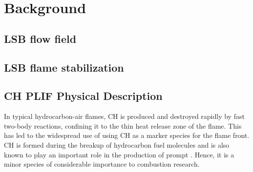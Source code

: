 \chapter{Background}






\section{LSB flow field}

\section{LSB flame stabilization}

\section{CH PLIF Physical Description}

In typical hydrocarbon-air flames, CH is produced and destroyed rapidly by fast two-body reactions, confining it to the thin heat release zone of the flame.
This has led to the widespread use of using CH as a marker species for the flame front.\cite{2005-vagelopoulos}
CH is formed during the breakup of hydrocarbon fuel molecules\cite{2010-kohler} and is also known to play an important role in the production of prompt .\cite{1971-fenimore}
Hence, it is a minor species of considerable importance to combustion research.

